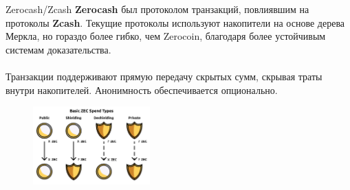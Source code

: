 \documentclass[aspectratio=169]{beamer}
\begin{document}
\begin{frame}{Zerocash/Zcash}
\textbf{Zerocash} был протоколом транзакций, повлиявшим на протоколы \textbf{Zcash}. Текущие протоколы используют накопители на основе дерева Меркла, но гораздо более гибко, чем Zerocoin, благодаря более устойчивым системам доказательства. \\~\\

Транзакции поддерживают прямую передачу скрытых сумм, скрывая траты внутри накопителей. Анонимность обеспечивается опционально.

\begin{figure}
\includegraphics[width=0.4\textwidth]{zcash-types.png}
\end{figure}
\end{frame}
\end{document}
